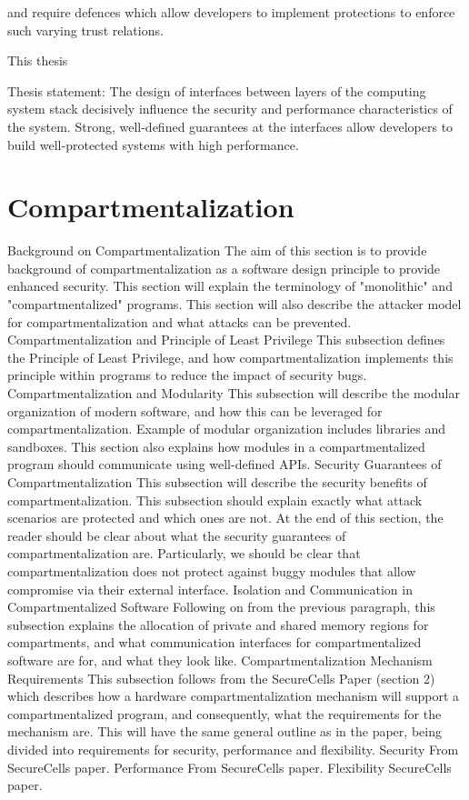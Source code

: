 and require defences which allow developers to implement protections to enforce such varying trust relations.

This thesis

Thesis statement: 
The design of interfaces between layers of the computing system stack decisively influence the 
security and performance characteristics of the system. 
Strong, well-defined guarantees at the interfaces allow developers to build well-protected systems with high performance.

\chapter{Compartmentalization}

Background on Compartmentalization
The aim of this section is to provide background of compartmentalization as a software design principle to provide enhanced security. This section will explain the terminology of "monolithic" and "compartmentalized" programs. This section will also describe the attacker model for compartmentalization and what attacks can be prevented.
Compartmentalization and Principle of Least Privilege 
This subsection defines the Principle of Least Privilege, and how compartmentalization implements this principle within programs to reduce the impact of security bugs.
Compartmentalization and Modularity
This subsection will describe the modular organization of modern software, and how this can be leveraged for compartmentalization. Example of modular organization includes libraries and sandboxes. This section also explains how modules in a compartmentalized program should communicate using well-defined APIs.
Security Guarantees of Compartmentalization
This subsection will describe the security benefits of compartmentalization. This subsection should explain exactly what attack scenarios are protected and which ones are not. At the end of this section, the reader should be clear about what the security guarantees of compartmentalization are. Particularly, we should be clear that compartmentalization does not protect against buggy modules that allow compromise via their external interface.
Isolation and Communication in Compartmentalized Software
Following on from the previous paragraph, this subsection explains the allocation of private and shared memory regions for compartments, and what communication interfaces for compartmentalized software are for, and what they look like.
Compartmentalization Mechanism Requirements 
This subsection follows from the SecureCells Paper (section 2) which describes how a hardware compartmentalization mechanism will support a compartmentalized program, and consequently, what the requirements for the mechanism are. This will have the same general outline as in the paper, being divided into requirements for security, performance and flexibility.
Security
From SecureCells paper.
Performance
From SecureCells paper.
Flexibility
SecureCells paper.
